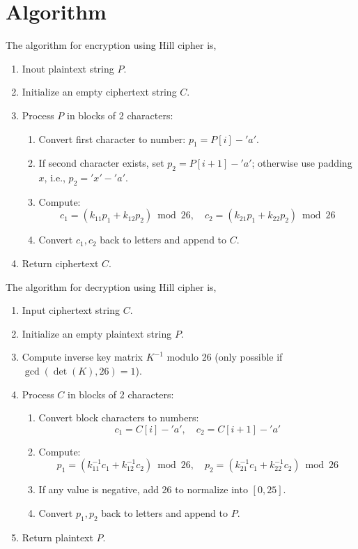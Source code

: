 \section{Algorithm}
The algorithm for encryption using Hill cipher is,
\begin{enumerate}
  \item Inout plaintext string \(P\).
  \item Initialize an empty ciphertext string \(C\).
  \item Process \(P\) in blocks of 2 characters:
  \begin{enumerate}
    \item Convert first character to number: \(p_1 = P[i]-'a'\).
    \item If second character exists, set \(p_2 = P[i+1]-'a'\); otherwise use padding \(x\), i.e., \(p_2 = 'x'-'a'\).
    \item Compute:
    \[
      c_1 = (k_{11}p_1 + k_{12}p_2)\bmod 26,\quad
      c_2 = (k_{21}p_1 + k_{22}p_2)\bmod 26
    \]
    \item Convert \(c_1, c_2\) back to letters and append to \(C\).
  \end{enumerate}
  \item Return ciphertext \(C\).
\end{enumerate}
The algorithm for decryption using Hill cipher is,
\begin{enumerate}
  \item Input ciphertext string \(C\).
  \item Initialize an empty plaintext string \(P\).
  \item Compute inverse key matrix \(K^{-1}\) modulo 26 (only possible if \(\gcd(\det(K),26)=1\)).
  \item Process \(C\) in blocks of 2 characters:
  \begin{enumerate}
    \item Convert block characters to numbers:
    \[
      c_1 = C[i]-'a',\quad c_2 = C[i+1]-'a'
    \]
    \item Compute:
    \[
      p_1 = (k^{-1}_{11}c_1 + k^{-1}_{12}c_2)\bmod 26,\quad
      p_2 = (k^{-1}_{21}c_1 + k^{-1}_{22}c_2)\bmod 26
    \]
    \item If any value is negative, add 26 to normalize into \([0,25]\).
    \item Convert \(p_1, p_2\) back to letters and append to \(P\).
  \end{enumerate}
  \item Return plaintext \(P\).
\end{enumerate}

